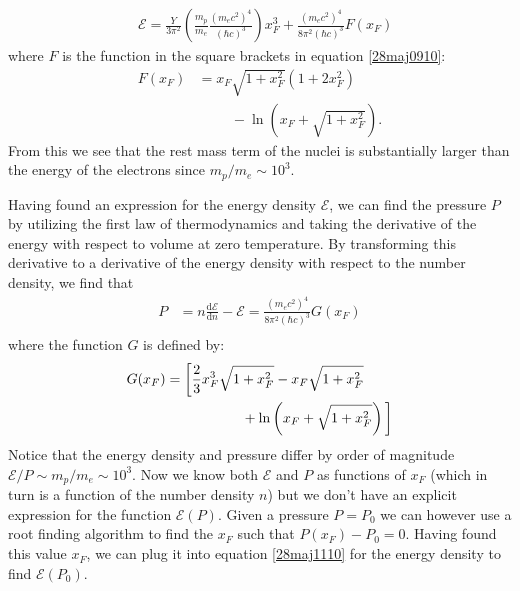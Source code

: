 \documentclass[twocolumn]{article}
\begin{document}
\begin{large}
\begin{equation}
    \label{28maj1110}
    \begin{split}
        &\mathcal{E}=\frac{Y}{3\pi^2}\left(\frac{m_p}{m_e}\frac{(m_ec^2)^4}{(\hbar c)^3}\right)x_F^3 + \frac{(m_ec^2)^4}{8\pi^2(\hbar c)^3}F(x_F)
    \end{split}
\end{equation}
where $F$ is the function in the square brackets in equation \eqref{28maj0910}:
\begin{equation}
    \label{28maj1448}
    \begin{split}
        F(x_F) &= x_F\sqrt{1+x_F^2}\left(1+2x_F^2\right) \\ 
        &\hspace{1cm}-\ln\left(x_F+\sqrt{1+x_F^2}\right).
    \end{split}
\end{equation}
From this we see that the rest mass term of the nuclei is substantially larger than the energy of the electrons since $m_p/m_e\sim 10^3$. 

Having found an expression for the energy density $\mathcal{E}$, we can find the pressure $P$ by utilizing the first law of thermodynamics and taking the derivative of the energy with respect to volume at zero temperature. By transforming this derivative to a derivative of the energy density with respect to the number density, we find that
\begin{equation}
    \label{28maj1025}
    \begin{split}
        P &= n\frac{\text{d}\mathcal{E}}{\text{d}n} - \mathcal{E} = \frac{(m_ec^2)^4}{8\pi^2(\hbar c)^3}G(x_F)\\ 
    \end{split}
\end{equation}
where the function $G$ is defined by:
\begin{equation}
    \label{28maj1450}
    \begin{split}
        &G(x_F) = \bigg[\frac{2}{3}x_F^3\sqrt{1+x_F^2}-x_F\sqrt{1+x_F^2} \\ 
        &\hspace{2.90cm}+\ln\left(x_F+\sqrt{1+x_F^2}\right)\bigg] \\ 
    \end{split}
\end{equation}
Notice that the energy density and pressure differ by order of magnitude $\mathcal{E}/P\sim m_p/m_e\sim 10^3$. Now we know both $\mathcal{E}$ and $P$ as functions of $x_F$ (which in turn is a function of the number density $n$) but we don't have an explicit expression for the function $\mathcal{E}(P)$. Given a pressure $P=P_0$ we can however use a root finding algorithm to find the $x_F$ such that $P(x_F) - P_0 = 0$. Having found this value $x_F$, we can plug it into equation \eqref{28maj1110} for the energy density to find $\mathcal{E}(P_0)$. 


\end{large}
\end{document}
